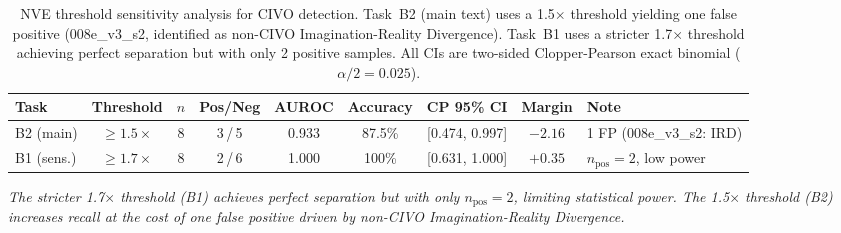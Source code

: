 \begin{table}[h]
\centering
\caption{NVE threshold sensitivity analysis for CIVO detection. Task~B2 (main text) uses a 1.5$\times$ threshold yielding one false positive (008e\_v3\_s2, identified as non-CIVO Imagination-Reality Divergence). Task~B1 uses a stricter 1.7$\times$ threshold achieving perfect separation but with only 2 positive samples. All CIs are two-sided Clopper-Pearson exact binomial ($\alpha/2 = 0.025$).}
\label{tab:nve_sensitivity}
\small
\setlength{\tabcolsep}{4pt}
\begin{tabular}{@{}lcccccccl@{}}
\toprule
Task & Threshold & $n$ & Pos/Neg & AUROC & Accuracy & CP 95\% CI & Margin & Note \\
\midrule
B2 (main) & $\geq 1.5\times$ & 8 & 3\,/\,5 & 0.933 & 87.5\% & [0.474, 0.997] & $-2.16$ & 1 FP (008e\_v3\_s2: IRD) \\
B1 (sens.) & $\geq 1.7\times$ & 8 & 2\,/\,6 & 1.000 & 100\% & [0.631, 1.000] & $+0.35$ & $n_{\text{pos}}=2$, low power \\
\bottomrule
\end{tabular}

\vspace{4pt}
\noindent\small\textit{The stricter 1.7$\times$ threshold (B1) achieves perfect separation but with only $n_{\text{pos}}=2$, limiting statistical power. The 1.5$\times$ threshold (B2) increases recall at the cost of one false positive driven by non-CIVO Imagination-Reality Divergence.}
\end{table}
